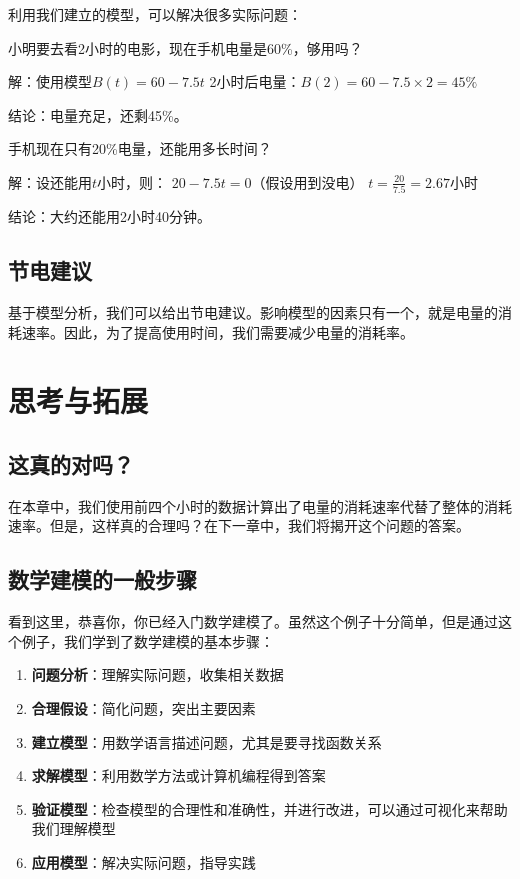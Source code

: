 利用我们建立的模型，可以解决很多实际问题：

\begin{example}[出门前的电量规划]
小明要去看2小时的电影，现在手机电量是60\%，够用吗？

解：使用模型$B(t) = 60 - 7.5t$
2小时后电量：$B(2) = 60 - 7.5 \times 2 = 45\%$

结论：电量充足，还剩45\%。
\end{example}

\begin{example}[紧急情况下的使用时间]
手机现在只有20\%电量，还能用多长时间？

解：设还能用$t$小时，则：
$20 - 7.5t = 0$（假设用到没电）
$t = \frac{20}{7.5} = 2.67$小时

结论：大约还能用2小时40分钟。
\end{example}

\subsection{节电建议}

基于模型分析，我们可以给出节电建议。影响模型的因素只有一个，就是电量的消耗速率。因此，为了提高使用时间，我们需要减少电量的消耗率。


\section{思考与拓展}\label{sec:thinking-extension}

\subsection{这真的对吗？}

在本章中，我们使用前四个小时的数据计算出了电量的消耗速率代替了整体的消耗速率。但是，这样真的合理吗？在下一章中，我们将揭开这个问题的答案。

\subsection{数学建模的一般步骤}

看到这里，恭喜你，你已经入门数学建模了。虽然这个例子十分简单，但是通过这个例子，我们学到了数学建模的基本步骤：

\begin{enumerate}
    \item \textbf{问题分析}：理解实际问题，收集相关数据
    \item \textbf{合理假设}：简化问题，突出主要因素
    \item \textbf{建立模型}：用数学语言描述问题，尤其是要寻找函数关系
    \item \textbf{求解模型}：利用数学方法或计算机编程得到答案
    \item \textbf{验证模型}：检查模型的合理性和准确性，并进行改进，可以通过可视化来帮助我们理解模型
    \item \textbf{应用模型}：解决实际问题，指导实践
\end{enumerate}

